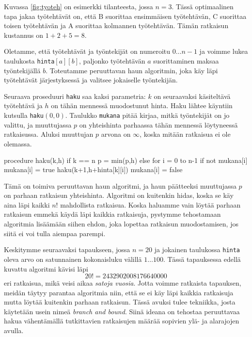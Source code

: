 Kuvassa \ref{fig:tyoteh} on esimerkki tilanteesta, jossa $n=3$.
Tässä optimaalinen tapa jakaa työtehtävät on,
että B suorittaa ensimmäisen työtehtävän,
C suorittaa toisen työtehtävän ja
A suorittaa kolmannen työtehtävän.
Tämän ratkaisun kustannus on $1+2+5=8$.

Oletamme, että työtehtävät ja työntekijät on numeroitu
$0 \dots n-1$ ja voimme lukea taulukosta \texttt{hinta}$[a][b]$,
paljonko työtehtävän $a$ suorittaminen maksaa
työntekijällä $b$.
Toteutamme peruuttavan haun algoritmin,
joka käy läpi työtehtävät järjestyksessä
ja valitsee jokaiselle työntekijän.

Seuraava proseduuri \texttt{haku} saa kaksi parametria:
$k$ on seuraavaksi käsitel\-tävä työtehtävä ja
$h$ on tähän mennessä muodostunut hinta.
Haku lähtee käyntiin kutsulla \texttt{haku}$(0,0)$.
Taulukko \texttt{mukana} pitää kirjaa,
mitkä työntekijät on jo valittu,
ja muuttujassa $p$ on yhteishinta
parhaassa tähän mennessä löytyneessä ratkaisussa.
Aluksi muuttujan $p$ arvona on $\infty$,
koska mitään ratkaisua ei ole olemassa.

\begin{code}
procedure haku(k,h)
    if k == n
        p = min(p,h)
    else
        for i = 0 to n-1
            if not mukana[i]
                mukana[i] = true
                haku(k+1,h+hinta[k][i])
                mukana[i] = false
\end{code}

Tämä on toimiva peruuttavan haun algoritmi,
ja haun päätteeksi muuttujassa $p$ on
parhaan ratkaisun yhteishinta.
Algoritmi on kuitenkin hidas, koska se käy aina läpi
kaikki $n!$ mahdollista ratkaisua.
Koska haluamme vain löytää parhaan ratkaisun emmekä
käydä läpi kaikkia ratkaisuja,
pystymme tehostamaan algoritmia lisäämään siihen ehdon,
joka lopettaa ratkaisun muodostamisen,
jos siitä ei voi tulla aiempaa parempi.

Keskitymme seuraavaksi tapaukseen, jossa $n=20$ ja jokainen
taulukossa \texttt{hinta} oleva arvo on satunnainen
kokonaisluku välillä $1 \dots 100$.
Tässä tapauksessa edellä kuvattu algoritmi kävisi läpi 
\[20! = 2432902008176640000
\]
eri ratkaisua, mikä veisi aikaa \emph{satoja vuosia}.
Jotta voimme ratkaista tapauksen,
meidän täytyy parantaa algoritmia niin,
että se ei käy läpi kaikkia ratkaisuja
mutta löytää kuitenkin parhaan ratkaisun.
Tässä avuksi tulee tekniikka, josta käytetään usein nimeä
\emph{branch and bound}.
Siinä ideana on tehostaa peruuttavaa hakua
vähentämällä tutkittavien ratkaisujen määrää
sopivien ylä- ja alarajojen avulla.

